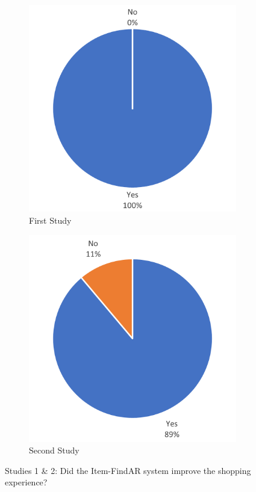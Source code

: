\documentclass[thesis]{fputhesis}
\begin{document}
\begin{body}
\begin{figure}[h]
    \centering
    \begin{subfigure}[]{.45\textwidth}
        \centering
        \includegraphics[width=\textwidth]{Images/experience study 1.png}
        \caption{First Study}
    \end{subfigure}
    \begin{subfigure}[]{.45\textwidth}
        \centering
        \includegraphics[width=\textwidth]{Images/experience study 2.png}
        \caption{Second Study}
    \end{subfigure}
    \caption{Studies 1 \& 2: Did the Item-FindAR system improve the shopping experience?}
    \label{fig:experience}
\end{figure}


\end{body}
\end{document}
